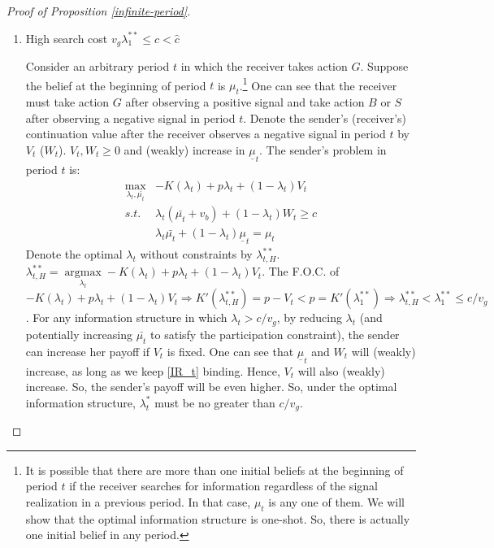 \documentclass[11pt]{extarticle}
\DeclareMathOperator*{\argmax}{argmax}
\newcommand{\ra}{\Rightarrow}
\begin{document}
\begin{proof}[Proof of Proposition \ref{infinite-period}]
	~
	\begin{enumerate}[(1)]
		\item High search cost $v_g \lambda_1^{**} \leq c < \widehat{c}$
		
		Consider an arbitrary period $t$ in which the receiver takes action $G$. Suppose the belief at the beginning of period $t$ is $\mu_t$.\footnote{It is possible that there are more than one initial beliefs at the beginning of period $t$ if the receiver searches for information regardless of the signal realization in a previous period. In that case, $\mu_t$ is any one of them. We will show that the optimal information structure is one-shot. So, there is actually one initial belief in any period.} One can see that the receiver must take action $G$ after observing a positive signal and take action $B$ or $S$ after observing a negative signal in period $t$. Denote the sender's (receiver's) continuation value after the receiver observes a negative signal in period $t$ by $V_t$ ($W_t$). $V_t, W_t \geq 0$ and (weakly) increase in $\underline{\mu}_t$. The sender's problem in period $t$ is:
		\begin{align*}
		\max\limits_{\lambda_t, \bar{\mu_t}}& -K(\lambda_t) + p \lambda_t + (1-\lambda_t) V_t\\
		s.t.~&\lambda_t (\bar{\mu_t} + v_b) + (1-\lambda_t) W_t \geq c \tag{$IR_t$} \\
		& \lambda_t \bar{\mu_t} + (1-\lambda_t) \underline{\mu}_t = \mu_t \tag{$F_t$} \label{F_t}
		\end{align*}
		Denote the optimal $\lambda_t$ without constraints by $\lambda_{t,H}^{**}$. $\lambda_{t,H}^{**} = \argmax\limits_{\lambda_t} -K(\lambda_t) + p \lambda_t + (1-\lambda_t) V_t$. The F.O.C. of $-K(\lambda_t) + p \lambda_t + (1-\lambda_t) V_t \ra K'(\lambda_{t,H}^{**}) = p - V_t < p = K'(\lambda_1^{**}) \ra \lambda_{t,H}^{**} < \lambda_1^{**} \leq c/v_g$. For any information structure in which $\lambda_{t} > c/v_g$, by reducing $\lambda_{t}$ (and potentially increasing $\bar{\mu_t}$ to satisfy the participation constraint), the sender can increase her payoff if $V_t$ is fixed. One can see that $\underline{\mu}_t$ and $W_t$ will (weakly) increase, as long as we keep \eqref{IR_t} binding. Hence, $V_t$ will also (weakly) increase. So, the sender's payoff will be even higher. So, under the optimal information structure, $\lambda_{t}^*$ must be no greater than $c/v_g$. %

\end{enumerate}
\end{proof}
\end{document}
